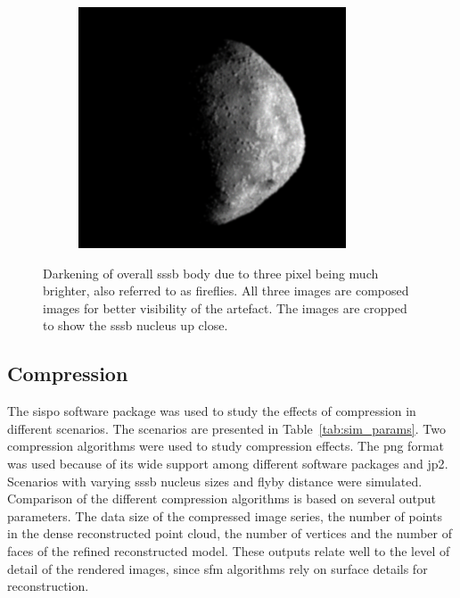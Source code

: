 \begin{figure}[htb]
\begin{subfigure}[b]{0.32\textwidth}
            \label{fig:render_dark_2}
        \end{subfigure}
        \begin{subfigure}[b]{0.32\textwidth}
            \centering
            \includegraphics[width=\textwidth]{doc/thesis/0_figures/composition_darkening/Inst_2017-08-15T115819-007000_center.png}
            \label{fig:render_dark_3}
        \end{subfigure}
    \caption{Darkening of overall \gls{sssb} body due to three pixel being much brighter, also referred to as fireflies. All three images are composed images for better visibility of the artefact. The images are cropped to show the \gls{sssb} nucleus up close.}
    \label{fig:render_dark}
\end{figure}

\subsection{Compression} \label{sec:results_comp}
The \gls{sispo} software package was used to study the effects of compression in different scenarios. The scenarios are presented in Table~\ref{tab:sim_params}. Two compression algorithms were used to study compression effects. The \gls{png} format was used because of its wide support among different software packages and \gls{jp2}. Scenarios with varying \gls{sssb} nucleus sizes and flyby distance were simulated. 
Comparison of the different compression algorithms is based on several output parameters. The data size of the compressed image series, the number of points in the dense reconstructed point cloud, the number of vertices and the number of faces of the refined reconstructed model. These outputs relate well to the level of detail of the rendered images, since \gls{sfm} algorithms rely on surface details for reconstruction.

